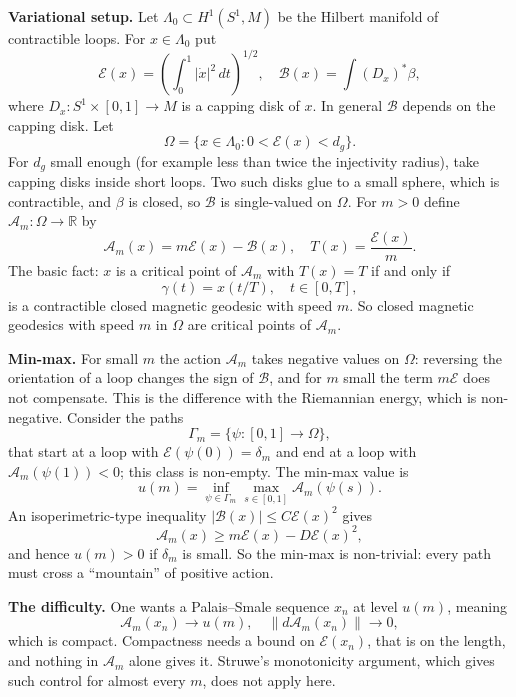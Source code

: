\medskip\noindent
{\bf Variational setup.} Let $\Lambda_0
\subset H^1(S^1,M)$ be the Hilbert manifold
of contractible loops. For $x \in \Lambda_0$
put
$$
\mathcal{E}(x) =
\left( \int_0^1 |\dot x|^2\, dt
\right)^{1/2},
\quad
\mathcal{B}(x) = \int (D_x)^*\beta,
$$
where $D_x : S^1 \times [0,1] \to M$ is a
capping disk of $x$. In general
$\mathcal{B}$ depends on the capping disk.
Let
$$
\Omega = \{ x \in \Lambda_0 :
0 < \mathcal{E}(x) < d_g \}.
$$
For $d_g$ small enough (for example
less than twice the injectivity radius),
take capping disks inside short loops. Two
such disks glue to a small sphere, which is
contractible, and $\beta$ is closed, so
$\mathcal{B}$ is single-valued on $\Omega$.
For $m > 0$ define
$\mathcal{A}_m : \Omega \to \mathbb{R}$ by
$$
\mathcal{A}_m(x) = m\mathcal{E}(x)
- \mathcal{B}(x),
\quad
T(x) = \frac{\mathcal{E}(x)}{m}.
$$
The basic fact: $x$ is a critical point of
$\mathcal{A}_m$ with $T(x) = T$ if and only
if
$$
\gamma(t) = x(t/T),
\quad
t \in [0,T],
$$
is a contractible closed magnetic geodesic
with speed $m$. So closed magnetic geodesics
with speed $m$ in $\Omega$ are critical
points of $\mathcal{A}_m$.

\medskip\noindent
{\bf Min-max.} For small $m$ the action
$\mathcal{A}_m$ takes negative values on
$\Omega$: reversing the orientation of a
loop changes the sign of $\mathcal{B}$, and
for $m$ small the term $m\mathcal{E}$ does
not compensate. This is the difference with
the Riemannian energy, which is
non-negative. Consider the paths
$$
\Gamma_m = \{ \psi : [0,1] \to \Omega \},
$$
that start at a loop with
$\mathcal{E}(\psi(0)) = \delta_m$ and end at
a loop with
$\mathcal{A}_m(\psi(1)) < 0$; this class is
non-empty. The min-max value is
$$
u(m) = \inf_{\psi \in \Gamma_m}
\max_{s \in [0,1]}
\mathcal{A}_m(\psi(s)).
$$
An isoperimetric-type inequality
$|\mathcal{B}(x)| \le C\mathcal{E}(x)^2$
gives
$$
\mathcal{A}_m(x) \ge m\mathcal{E}(x)
- D\mathcal{E}(x)^2,
$$
and hence $u(m) > 0$ if $\delta_m$ is small.
So the min-max is non-trivial: every path
must cross a ``mountain'' of positive
action.

\medskip\noindent
{\bf The difficulty.} One wants a
Palais--Smale sequence $x_n$ at level
$u(m)$, meaning
$$
\mathcal{A}_m(x_n) \to u(m),
\quad
\|d\mathcal{A}_m(x_n)\| \to 0,
$$
which is compact. Compactness needs a bound
on $\mathcal{E}(x_n)$, that is on the length,
and nothing in $\mathcal{A}_m$ alone gives
it. Struwe's monotonicity argument, which
gives such control for almost every $m$,
does not apply here.

